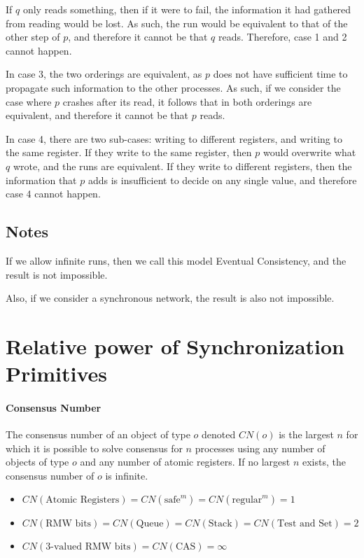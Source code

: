 \documentclass{idc_msc}
\begin{document}
If $q$ only reads something, then if it were to fail, the information it had gathered from reading would be lost.
As such, the run would be equivalent to that of the other step of $p$, and therefore it cannot be that $q$ reads.
Therefore, case 1 and 2 cannot happen.

In case 3, the two orderings are equivalent, as $p$ does not have sufficient time to propagate such information to the other processes.
As such, if we consider the case where $p$ crashes after its read, it follows that in both orderings are equivalent, and therefore it cannot be that $p$ reads.

In case 4, there are two sub-cases: writing to different registers, and writing to the same register. If they write to the same register, then $p$ would overwrite what $q$ wrote, and the runs are equivalent. If they write to different registers, then the information that $p$ adds is insufficient to decide on any single value, and therefore case 4 cannot happen.

\subsection{Notes}

If we allow infinite runs, then we call this model Eventual Consistency, and the result is not impossible.

Also, if we consider a synchronous network, the result is also not impossible.

\clearpage
\section{Relative power of Synchronization Primitives}

\paragraph{Consensus Number}
The consensus number of an object of type $o$ denoted $CN(o)$ is the largest $n$ for which it is possible to solve consensus for $n$ processes using any number of objects of type $o$ and any number of atomic registers. If no largest $n$ exists, the consensus number of $o$ is infinite.

\begin{itemize}
  \item $CN(\text{Atomic Registers}) = CN(\text{safe}^m) = CN(\text{regular}^m) = 1$
  \item $CN(\text{RMW bits}) = CN(\text{Queue}) = CN(\text{Stack}) = CN(\text{Test and Set}) = 2$
  \item $CN(\text{3-valued RMW bits}) = CN(\text{CAS}) = \infty$
\end{itemize}
\end{document}
